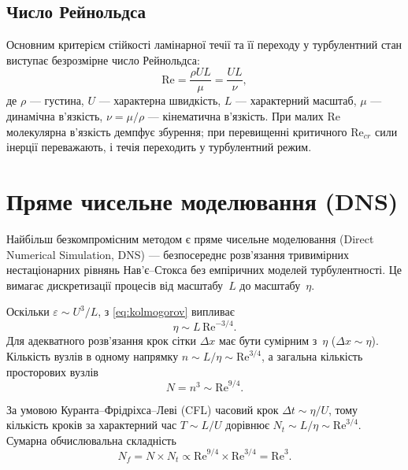 \documentclass[14pt,a4paper,extarticle]{extarticle}
\newcommand{\Rey}{\mathrm{Re}}
\begin{document}
\subsection{Число Рейнольдса}

Основним критерієм стійкості ламінарної течії та її переходу у турбулентний
стан виступає безрозмірне число Рейнольдса:
\begin{equation}
  \Rey = \frac{\rho U L}{\mu} = \frac{U L}{\nu},
  \label{eq:reynolds}
\end{equation}
де $\rho$ --- густина, $U$ --- характерна швидкість, $L$ --- характерний
масштаб, $\mu$ --- динамічна в'язкість, $\nu = \mu/\rho$ --- кінематична
в'язкість. При малих $\Rey$ молекулярна в'язкість демпфує збурення; при
перевищенні критичного $\Rey_{cr}$ сили інерції переважають, і течія
переходить у турбулентний режим.

\section{Пряме чисельне моделювання (DNS)}

Найбільш безкомпромісним методом є пряме чисельне моделювання (Direct
Numerical Simulation, DNS) --- безпосереднє розв'язання тривимірних
нестаціонарних рівнянь Нав'є--Стокса без емпіричних моделей турбулентності.
Це вимагає дискретизації процесів від масштабу~$L$ до масштабу~$\eta$.

Оскільки $\varepsilon \sim U^3/L$, з \eqref{eq:kolmogorov} випливає
\begin{equation}
  \eta \sim L\,\Rey^{-3/4}.
  \label{eq:eta-re}
\end{equation}
Для адекватного розв'язання крок сітки $\Delta x$ має бути сумірним з~$\eta$
($\Delta x \sim \eta$). Кількість вузлів в одному напрямку $n \sim L/\eta
\sim \Rey^{3/4}$, а загальна кількість просторових вузлів
\begin{equation}
  N = n^3 \sim \Rey^{9/4}.
  \label{eq:nodes}
\end{equation}

За умовою Куранта--Фрідріхса--Леві (CFL) часовий крок $\Delta t \sim \eta/U$,
тому кількість кроків за характерний час $T \sim L/U$ дорівнює
$N_t \sim L/\eta \sim \Rey^{3/4}$. Сумарна обчислювальна складність
\begin{equation}
  N_f = N \times N_t \propto \Rey^{9/4} \times \Rey^{3/4} = \Rey^3.
  \label{eq:complexity}
\end{equation}
\end{document}
